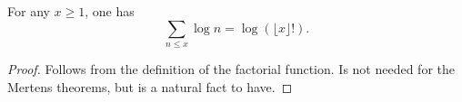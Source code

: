 \begin{proposition}
\label{Mertens-sum-log-eq-log-factorial}
\leanok
For any $x \geq 1$, one has
$$ \sum_{n \leq x} \log n = \log(\lfloor x \rfloor!). $$
\end{proposition}
\begin{proof}
\leanok
Follows from the definition of the factorial function.  Is not needed for the Mertens theorems, but is a natural fact to have.
\end{proof}
